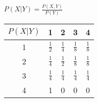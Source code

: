 {\begin{center}
$P(X|Y) = \frac{P(X,Y)}{P(Y)}$
\end{center}

\begin{latin}
\begin{center}
  \renewcommand{\arraystretch}{1.6}
  \begin{tabular}{| c | c | c | c | c |}
    \hline
    $P(X|Y)$ & 1 & 2 & 3 & 4 \\ \hline
    1 & $\frac{1}{2}$ & $\frac{1}{4}$ & $\frac{1}{8}$ & $\frac{1}{8}$ \\ \hline
    2 & $\frac{1}{4}$ & $\frac{1}{2}$ & $\frac{1}{8}$ & $\frac{1}{8}$ \\ \hline
    3 & $\frac{1}{4}$ & $\frac{1}{4}$ & $\frac{1}{4}$ & $\frac{1}{4}$ \\ \hline
    4 & 1 & 0 & 0 & 0 \\
    \hline
  \end{tabular}
\end{center}
\end{latin}
}
